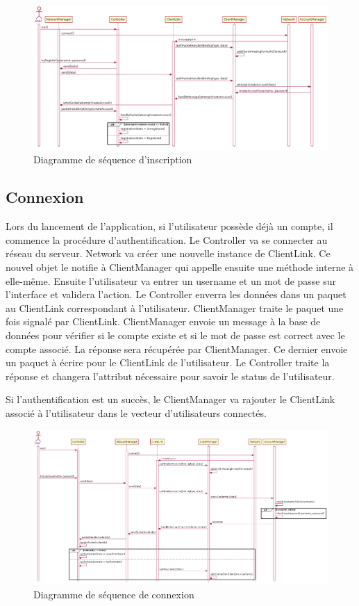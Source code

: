 \documentclass{article}
\begin{document}
\begin{figure}[H]
    \centering
    \includegraphics[width=1\textwidth]{../../res/uml/sequence/InscriptionSequence.png}
    \caption{Diagramme de séquence d'inscription}
    \label{fig:InscriptionDiagram}
\end{figure}

\subsection{Connexion}

Lors du lancement de l'application, si l'utilisateur possède déjà un compte, il commence la procédure d'authentification. Le Controller va se connecter au réseau du serveur. Network va créer une nouvelle instance de ClientLink. Ce nouvel objet le notifie à ClientManager qui appelle ensuite une méthode interne à elle-même. Ensuite l'utilisateur va entrer un username et un mot de passe sur l'interface et validera l'action. Le Controller enverra les données dans un paquet au ClientLink correspondant à l'utilisateur. ClientManager traite le paquet une fois signalé par ClientLink. ClientManager envoie un message à la base de données pour vérifier si le compte existe et si le mot de passe est correct avec le compte associé. La réponse sera récupérée par ClientManager. Ce dernier envoie un paquet à écrire pour le ClientLink de l'utilisateur. Le Controller traite la réponse et changera l'attribut nécessaire pour savoir le status de l'utilisateur.

Si l'authentification est un succès, le ClientManager va rajouter le ClientLink associé à l'utilisateur dans le vecteur d'utilisateurs connectés.

\begin{figure}[H]
    \centering
    \includegraphics[width=1\textwidth]{../../res/uml/sequence/ConnexionSequence.png}
    \caption{Diagramme de séquence de connexion}
    \label{fig:ConnexionSeqDiagram}
\end{figure}
\end{document}
